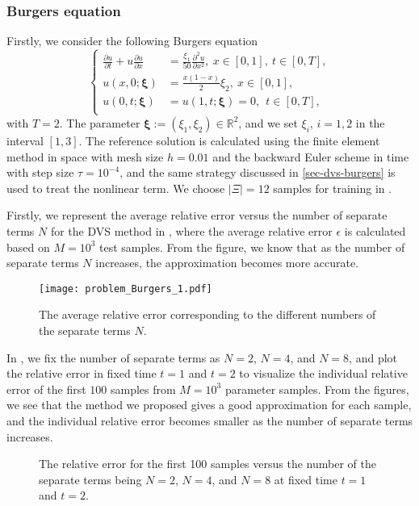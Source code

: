 \documentclass[10pt,a4paper]{article}
\numberwithin{equation}{section}
\numberwithin{lemma}{section}
\numberwithin{example}{section}
\numberwithin{definition}{section}
\numberwithin{assumption}{section}
\numberwithin{theorem}{section}
\numberwithin{proposition}{section}
\numberwithin{corollary}{section}
\numberwithin{remark}{section}
\begin{document}
    \subsubsection{Burgers equation}
	Firstly, we consider the following Burgers equation
	$$
		\left\{
		\begin{aligned}
			\frac{\partial u}{\partial t}+u\frac{\partial u}{\partial {x}}&=\frac{{\xi}_1}{50}\frac{\partial^2 u}{\partial {x}^2},\ {x}\in [0,1],\ t\in[0,T],\\
			u({x},0;\bm{\xi})&=\frac{{x}(1-{x})}{2}{\xi}_2,\  {x}\in [0,1],\\
            u(0,t;\bm{\xi})&=u(1,t;\bm{\xi})=0,~~t\in[0,T],\\
		\end{aligned}
		\right.
	$$
	with $T=2$. The parameter $\bm{\xi}:=(\xi_1,\xi_2)\in \mathbb{R}^2$, and we set $\xi_i$, $i=1,2$ in the interval $[1,3]$.
	The reference solution is calculated using the finite element method in space with mesh size $h=0.01$ and the backward Euler scheme in time with step size $\tau=10^{-4}$, and the same strategy discussed in \cref{sec-dvs-burgers} is used to treat the nonlinear term.
    We choose $|\Xi|=12$ samples for training in .
	
	Firstly, we represent the average relative error versus the number of separate terms $N$ for the DVS method in , where the average relative error $\epsilon$ is calculated based on $M=10^3$ test samples.
	From the figure, we know that as the number of separate terms $N$ increases, the approximation becomes more accurate.
	\begin{figure}[htbp]
		\centering
		\texttt{[image: problem\_Burgers\_1.pdf]}
		\caption{ The average relative error corresponding to the different numbers of the separate terms $N$.}
		\label{fig_burgers.1}
	\end{figure}
	
	In , we fix the number of separate terms as $N=2$, $N=4$, and $N=8$, and plot the relative error in fixed time $t=1$ and $t=2$ to visualize the individual relative error of the first $100$ samples from $M=10^3$ parameter samples. 
	From the figures, we see that the method we proposed gives a good approximation for each sample, and the individual relative error becomes smaller as the number of separate terms increases.
\begin{figure}[htbp]
    \centering
    \caption{The relative error for the first 100 samples versus the number of the separate terms being $N=2$, $N=4$, and $N=8$ at fixed time $t=1$ and $t=2$.}
    \label{fig_burgers.2}
\end{figure}
\end{document}
